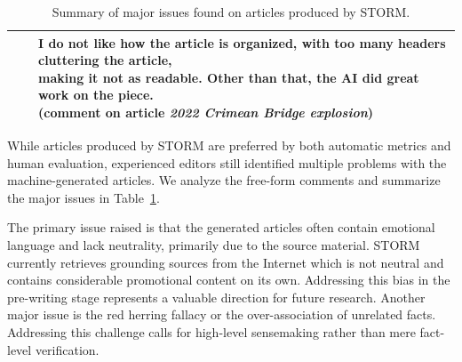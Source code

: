 \documentclass[11pt]{article}
\newcommand{\system}[0]{STORM\xspace}
\newcommand{\reftab}[1]{Table~\ref{#1}}
\begin{document}
\begin{table}
{\begin{tabular}{ccl}
\cmidrule{3-3}
                                                             &                     & \makecell[l]{I do not like how the article is organized, with too many headers cluttering the article,\\ making it not as readable. Other than that, the AI did great work on the piece. \\(comment on article \textit{2022 Crimean Bridge explosion})}                                                                                                                       \\
\bottomrule
\end{tabular}
}
\caption{Summary of major issues found on articles produced by \system.}
\label{table:comment_summary}
\end{table}


While articles produced by \system are preferred by both automatic metrics and human evaluation, experienced editors still identified multiple problems with the machine-generated articles. We analyze the free-form comments and summarize the major issues in \reftab{table:comment_summary}.

The primary issue raised is that the generated articles often contain emotional language and lack neutrality, primarily due to the source material. \system currently retrieves grounding sources from the Internet which is not neutral and contains considerable promotional content on its own. Addressing this bias in the pre-writing stage represents a valuable direction for future research. Another major issue is the red herring fallacy or the over-association of unrelated facts. Addressing this challenge calls for high-level sensemaking rather than mere fact-level verification.
\end{document}

